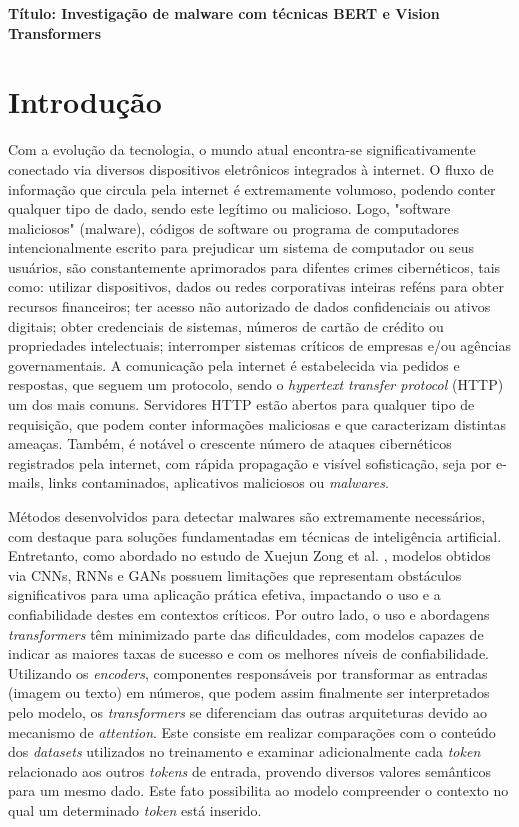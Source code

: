 {\large \bfseries Título: Investigação de malware com técnicas BERT e Vision Transformers} %
\section{Introdução}

   Com a evolução da tecnologia, o mundo atual encontra-se significativamente conectado via diversos dispositivos eletrônicos integrados à internet. O fluxo de informação que circula pela internet é extremamente volumoso, podendo conter qualquer tipo de dado, sendo este legítimo ou malicioso. Logo, "software maliciosos" (malware), códigos de software ou programa de computadores intencionalmente escrito para prejudicar um sistema de computador ou seus usuários, são constantemente aprimorados para difentes crimes cibernéticos, tais como: utilizar dispositivos, dados ou redes corporativas inteiras reféns para obter recursos financeiros; ter acesso não autorizado de dados confidenciais ou ativos digitais; obter credenciais de sistemas, números de cartão de crédito ou propriedades intelectuais; interromper sistemas críticos de empresas e/ou agências governamentais. A comunicação pela internet é estabelecida via pedidos e respostas, que seguem um protocolo, sendo o \textit{hypertext transfer protocol} (HTTP) um dos mais comuns. Servidores HTTP estão abertos para qualquer tipo de requisição, que podem conter informações maliciosas e que caracterizam distintas ameaças. Também, é notável o crescente número de ataques cibernéticos registrados pela internet, com rápida propagação e visível sofisticação, seja por e-mails, links contaminados, aplicativos maliciosos ou \textit{malwares}. 
   
   Métodos desenvolvidos para detectar malwares são extremamente necessários, com destaque para soluções fundamentadas em técnicas de inteligência artificial. Entretanto, como abordado no estudo de Xuejun Zong et al. \cite{he2024network}, modelos obtidos via CNNs, RNNs e GANs possuem limitações que representam obstáculos significativos para uma aplicação prática efetiva, impactando o uso e a confiabilidade destes em contextos críticos. Por outro lado, o uso e abordagens \textit{transformers} têm minimizado parte das dificuldades, com modelos capazes de indicar as maiores taxas de sucesso e com os melhores níveis de confiabilidade. Utilizando os \textit{encoders}, componentes responsáveis por transformar as entradas (imagem ou texto) em números, que podem assim finalmente ser interpretados pelo modelo, os \textit{transformers} se diferenciam das outras arquiteturas devido ao mecanismo de \textit{attention}. Este consiste em realizar comparações com o conteúdo dos \textit{datasets} utilizados no treinamento e examinar adicionalmente cada \textit{token} relacionado aos outros \textit{tokens} de entrada, provendo diversos valores semânticos para um mesmo dado. Este fato possibilita ao modelo compreender o contexto no qual um determinado \textit{token} está inserido. 
   
